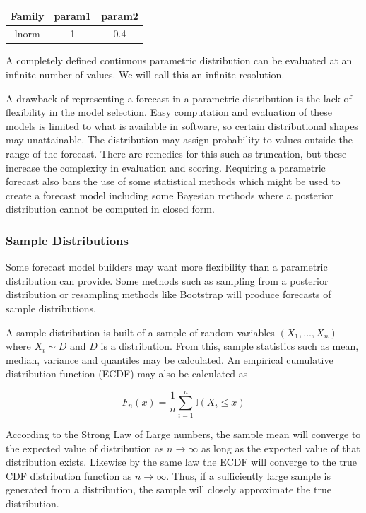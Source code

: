 \documentclass{article}\usepackage[]{graphicx}\usepackage[]{color}
\begin{document}
\begin{table}[h!]
\centering
 \begin{tabular}{|c c c|} 
 \hline
 Family & param1 & param2 \\ [0.5ex] 
 \hline
 lnorm & 1 & 0.4 \\ 
 \hline
 \end{tabular}
\end{table}

A completely defined continuous parametric distribution can be evaluated at an
infinite number of values. We will call this an infinite resolution.


A drawback of representing a forecast in a parametric distribution is the lack 
of flexibility in the model selection. Easy computation and evaluation of these 
models is limited to what is available in software, so certain distributional
shapes may unattainable. The distribution may assign probability to values
outside the range of the forecast. There are remedies for this such as 
truncation, but these increase the complexity in evaluation and scoring.
Requiring a parametric forecast also bars the use of some statistical methods
which might be used to create a forecast model including some Bayesian methods
where a posterior distribution cannot be computed in closed form.


\subsubsection{Sample Distributions}
Some forecast model builders may want more flexibility than a parametric 
distribution can provide. Some methods such as sampling from a posterior 
distribution or resampling methods like Bootstrap will produce forecasts of
sample distributions. 

A sample distribution is built of a sample of random variables 
$(X_1,...,X_n)$ where $X_i \sim D$ and $D$ is a distribution. From this, sample
statistics such as mean, median, variance and quantiles may be calculated. 
An empirical cumulative distribution function (ECDF) may also be calculated as

\begin{equation}
\label{eq:ecdf}
  F_n(x) = \frac{1}{n} \sum_{i=1}^n \mathbb{I}(X_i \leq x)
\end{equation}

According to the Strong Law of Large numbers, the sample mean will converge to
the expected value of distribution as $n \rightarrow \infty$ as long as the 
expected value of that distribution exists. Likewise by the same law the 
ECDF will converge to the true CDF 
distribution function as $n \rightarrow \infty$. Thus, if a sufficiently large 
sample is generated from a distribution, the sample will closely approximate the 
true distribution. 
\end{document}

